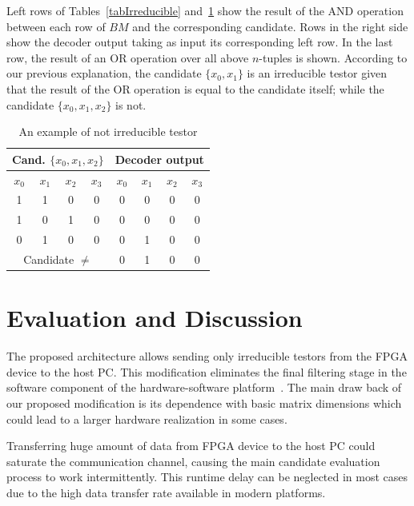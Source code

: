 \documentclass[conference]{IEEEtran}
\begin{document}
		
Left rows of Tables~\ref{tabIrreducible} and~\ref{tabNotIrreducible} show the result of the AND operation between each row of $BM$ and the corresponding candidate. Rows in the right side show the decoder output taking as input its corresponding left row. In the last row, the result of an OR operation over all above $n$-tuples is shown. According to our previous explanation, the candidate $\{x_0,x_1\}$ is an irreducible testor given that the result of the OR operation is equal to the candidate itself; while the candidate $\{x_0,x_1,x_2\}$ is not.



\begin{table}[htb]
	\renewcommand{\arraystretch}{1.3}
	\caption{An example of not irreducible testor}
	\label{tabNotIrreducible}
	\centering
	\begin{tabular}{cccc|cccc}
	 	\hline                       
  		\multicolumn{4}{c|}{Cand. $\{x_0, x_1, x_2\}$} & 
  		\multicolumn{4}{c}{Decoder output} \\
  		\hline
		$x_0$ &  $x_1$ &   $x_2$ & $x_3$ &
  		$x_0$ &  $x_1$ &   $x_2$ & $x_3$  \\
  		\hline
  		1 & 1 & 0 & 0 & 0 & 0 & 0 & 0 \\
  		1 & 0 & 1 & 0 & 0 & 0 & 0 & 0 \\
  		0 & 1 & 0 & 0 & 0 & 1 & 0 & 0 \\
  		\hline  
  		\multicolumn{4}{c|}{Candidate $\neq$} & 0 & 1 & 0 & 0\\
  		\hline  
	\end{tabular}
\end{table}

\section{Evaluation and Discussion}
\label{sect:6}

The proposed architecture allows sending only irreducible testors from the FPGA device to the 
host PC. This modification eliminates the final filtering stage in the software component of the 
hardware-software platform~\cite{Rojas12}. The main draw back of our proposed modification is its 
dependence with basic matrix dimensions which could lead to a larger hardware realization in some 
cases.  

Transferring huge amount of data from FPGA device to the host PC could saturate the communication 
channel, causing the main candidate evaluation process to work intermittently. This runtime delay 
can be neglected in most cases due to the high data transfer rate available in modern platforms. 
\end{document}
